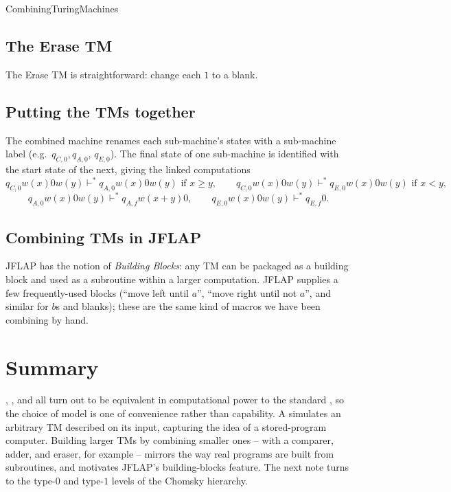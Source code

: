 \documentclass[hidelinks]{article}
\begin{document}
\begin{smodule}[title={Further Turing Machine Models, and Combining Turing Machines}]{CombiningTuringMachines}
\subsection{The Erase TM}

The Erase TM is straightforward: change each $1$ to a blank.

\subsection{Putting the TMs together}

The combined machine renames each sub-machine's states with a sub-machine label (e.g.\ $q_{C,0}, q_{A,0}$, $q_{E,0}$). The final state of one sub-machine is identified with the start state of the next, giving the linked computations
\[
q_{C, 0} w(x) 0 w(y) \vdash^* q_{A, 0} w(x) 0 w(y) \text{ if } x \geq y, \qquad q_{C, 0} w(x) 0 w(y) \vdash^* q_{E, 0} w(x) 0 w(y) \text{ if } x < y,
\]
\[
q_{A, 0} w(x) 0 w(y) \vdash^* q_{A, f} w(x + y) 0, \qquad q_{E, 0} w(x) 0 w(y) \vdash^* q_{E, f} 0.
\]

\subsection{Combining TMs in JFLAP}

JFLAP has the notion of \emph{Building Blocks}: any TM can be packaged as a building block and used as a subroutine within a larger computation. JFLAP supplies a few frequently-used blocks (``move left until $a$'', ``move right until not $a$'', and similar for $b$s and blanks); these are the same kind of macros we have been combining by hand.

\section{Summary}

, , and  all turn out to be equivalent in computational power to the standard , so the choice of model is one of convenience rather than capability. A  simulates an arbitrary TM described on its input, capturing the idea of a stored-program computer. Building larger TMs by combining smaller ones -- with a comparer, adder, and eraser, for example -- mirrors the way real programs are built from subroutines, and motivates JFLAP's building-blocks feature. The next note turns to the type-$0$ and type-$1$ levels of the Chomsky hierarchy.

\end{smodule}
\end{document}
